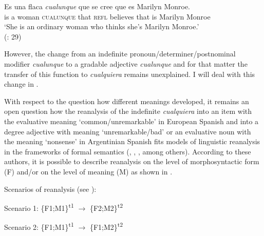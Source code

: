 \ea \label{ex:key:120} %
  \gll Es una flaca \textit{cualunque} que se cree que es Marilyn Monroe.\\
  is a woman \textsc{cualunque} that \textsc{refl} believes that is Marilyn Monroe\\
  \glt ‘She is an ordinary woman who thinks she’s Marilyn Monroe.’\\
  (\citealt{Rizzosalierno2013}: 29)
\z

However, the change from an indefinite pronoun/determiner/postnominal modifier \textit{cualunque} to a gradable adjective \textit{cualunque} and for that matter the transfer of this function to \textit{cualquiera} remains unexplained. I will deal with this change in .

With respect to the question how different meanings developed, it remains an open question how the reanalysis of the indefinite \textit{cualquiera} into an item with the evaluative meaning ‘common/unremarkable’ in European Spanish and into a degree adjective with meaning ‘unremarkable/bad’ or an evaluative noun with the meaning ‘nonsense’ in Argentinian Spanish fits models of linguistic reanalysis in the frameworks of formal semantics (\citealt{Eckardt2006}, \citealt{Bar-asher-siegal2020}, \citealt{Aloni2021}, among others). According to these authors, it is possible to describe reanalysis on the level of morphosyntactic form (F) and/or on the level of meaning (M) as shown in .


\ea \label{bkm:Ref65487536}  %
Scenarios of reanalysis (see \citealt{Aloni2021}):

  Scenario 1: \{F1;M1\}\textsuperscript{t1} $\rightarrow$  \{F2;M2\}\textsuperscript{t2}

  Scenario 2: \{F1;M1\}\textsuperscript{t1} $\rightarrow$  \{F1;M2\}\textsuperscript{t2}

